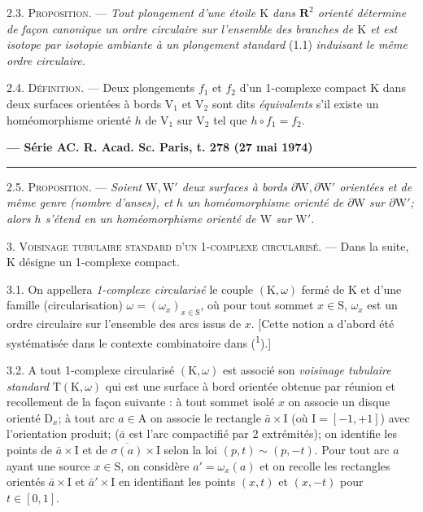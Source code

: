 2.3. \textsc{Proposition.} --- \textit{Tout plongement d'une étoile \(\mathrm{K}\) dans \(\mathbf{R}^2\) orienté détermine de façon canonique un ordre circulaire sur l'ensemble des branches de \(\mathrm{K}\) et est isotope par isotopie ambiante à un plongement standard} (1.1) \textit{induisant le même ordre circulaire.}

2.4. \textsc{Définition.} --- Deux plongements \(f_1\) et \(f_2\) d'un 1-complexe compact \(\mathrm{K}\) dans deux surfaces orientées à bords \(\mathrm{V}_1\) et \(\mathrm{V}_2\) sont dits \textit{équivalents} s'il existe un homéomorphisme orienté \(h\) de \(\mathrm{V}_1\) sur \(\mathrm{V}_2\) tel que \(h\circ f_1=f_2\).

\textbf{--- Série A}\hfill\textbf{C. R. Acad. Sc. Paris, t. 278 (27 mai 1974)}\par\noindent\rule{\linewidth}{.35pt}\par

2.5. \textsc{Proposition.} --- \textit{Soient \(\mathrm{W},\mathrm{W}'\) deux surfaces à bords \(\partial\mathrm{W},\partial\mathrm{W}'\) orientées et de même genre (nombre d'anses), et \(h\) un homéomorphisme orienté de \(\partial\mathrm{W}\) sur \(\partial\mathrm{W}'\); alors \(h\) s'étend en un homéomorphisme orienté de \(\mathrm{W}\) sur \(\mathrm{W}'\).}

3. \textsc{Voisinage tubulaire standard d'un 1-complexe circularisé.} --- Dans la suite, \(\mathrm{K}\) désigne un 1-complexe compact.

3.1. On appellera \textit{1-complexe circularisé} le couple \((\mathrm{K},\omega)\) fermé de \(\mathrm{K}\) et d'une famille (circularisation) \(\omega=(\omega_x)_{x\in\mathrm{S}}\), où pour tout sommet \(x\in\mathrm{S}\), \(\omega_x\) est un ordre circulaire sur l'ensemble des arcs issus de \(x\). [Cette notion a d'abord été systématisée dans le contexte combinatoire dans (\textsuperscript{1}).]

3.2. A tout 1-complexe circularisé \((\mathrm{K},\omega)\) est associé son \textit{voisinage tubulaire standard} \(\mathrm{T}(\mathrm{K},\omega)\) qui est une surface à bord orientée obtenue par réunion et recollement de la façon suivante : à tout sommet isolé \(x\) on associe un disque orienté \(\mathrm{D}_x\); à tout arc \(a\in\mathrm{A}\) on associe le rectangle \(\bar a\times\mathrm{I}\) (où \(\mathrm{I}=[-1,+1]\)) avec l'orientation produit; (\(\bar a\) est l'arc compactifié par 2 extrémités); on identifie les points de \(\bar a\times\mathrm{I}\) et de \(\overline{\sigma(a)}\times\mathrm{I}\) selon la loi \((p,t)\sim(p,-t)\). Pour tout arc \(a\) ayant une source \(x\in\mathrm{S}\), on considère \(a'=\omega_x(a)\) et on recolle les rectangles orientés \(\bar a\times\mathrm{I}\) et \(\bar a'\times\mathrm{I}\) en identifiant les points \((x,t)\) et \((x,-t)\) pour \(t\in[0,1]\).

